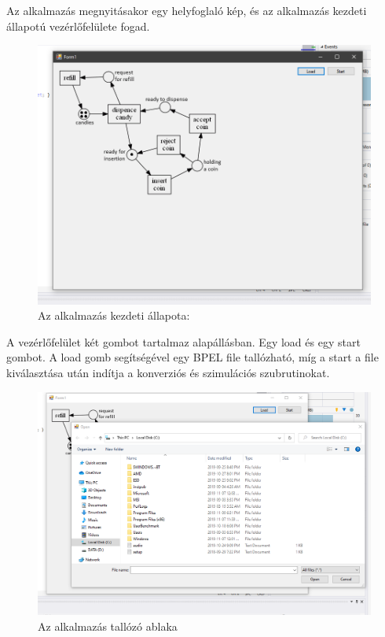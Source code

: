 Az alkalmazás megnyitásakor egy helyfoglaló kép, és az alkalmazás kezdeti állapotú vezérlőfelülete fogad. 
\begin{figure}[h!]
\centering
\includegraphics[scale=0.5]{images/UIlayout.png}
\caption{Az alkalmazás kezdeti állapota:}
\label{fig:flow}
\end{figure}
A vezérlőfelület két gombot tartalmaz alapállásban. Egy load és egy start gombot. A load gomb segítségével egy BPEL file tallózható, míg a start a file kiválasztása  után indítja a konverziós és szimulációs szubrutinokat. 
\begin{figure}[h!]
\centering
\includegraphics[scale=0.5]{images/fileDialog.png}
\caption{Az alkalmazás tallózó ablaka}
\end{figure}

